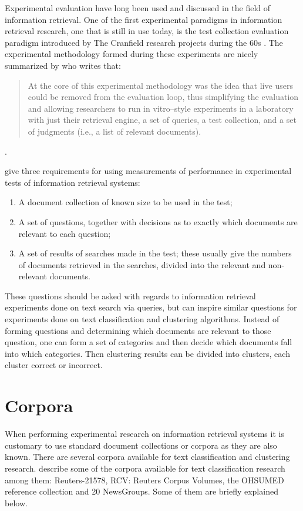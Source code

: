 Experimental evaluation have long been used and discussed in the field of information retrieval. One of the first experimental paradigms in information retrieval research, one that is still in use today, is the test collection evaluation paradigm introduced by The Cranfield research projects during the 60s \cite{Cleverdon1966}. The experimental methodology formed during these experiments are nicely summarized by \cite[][564]{Voorhees2005} who writes that:

\begin{quote}
At the core of this experimental methodology was the idea that live users could be removed from the evaluation loop, thus simplifying the evaluation and allowing researchers to run in vitro–style experiments in a laboratory with just their retrieval engine, a set of queries, a test collection, and a set of judgments (i.e., a list of relevant documents).
\end{quote}.

\cite[p. 33]{Cleverdon1966} give three requirements for using measurements of performance in experimental tests of information retrieval systems:
\begin{enumerate}
\item A document collection of known size to be used in the test;
\item A set of questions, together with decisions as to exactly which documents are relevant to each question;
\item A set of results of searches made in the test; these usually give the numbers of documents retrieved in the searches, divided into the relevant and non-relevant documents.
\end{enumerate}
These questions should be asked with regards to information retrieval experiments done on text search via queries, but can inspire similar questions for experiments done on text classification and clustering algorithms. Instead of forming questions and determining which documents are relevant to those question, one can form a set of categories and then decide which documents fall into which categories. Then clustering results can be divided into clusters, each cluster correct or incorrect.

\section{Corpora}
\label{Corpora}

When performing experimental research on information retrieval systems it is customary to use standard document collections or corpora as they are also known. There are several corpora available for text classification and clustering research. \cite{Baeza-Yates2011a} describe some of the corpora available for text classification research among them: Reuters-21578, RCV: Reuters Corpus Volumes, the OHSUMED reference collection and 20 NewsGroups. Some of them are briefly explained below.

